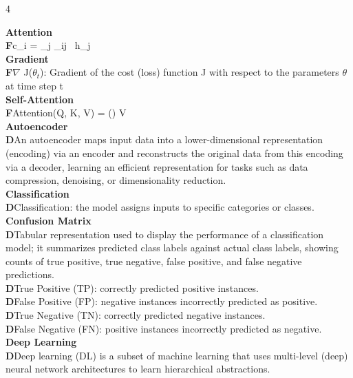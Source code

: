 \documentclass[8pt]{extarticle}
\newcommand{\ftag}{\textcolor{formulacolor}{\tiny\textbf{F}}\;}
\newcommand{\dtag}{\textcolor{definitioncolor}{\tiny\textbf{D}}\;}
\begin{document}
\scriptsize
\begin{multicols}{4}

\vspace{2pt}\textbf{Attention}\\
\ftag c\_i = \sum\_{j} \alpha\_{ij} \, h\_j\\
\vspace{2pt}\textbf{Gradient}\\
\ftag $\nabla$ J($\theta_t$): Gradient of the cost (loss) function J with respect to the parameters $\theta$ at time step t\\
\vspace{2pt}\textbf{Self-Attention}\\
\ftag Attention(Q, K, V) = \left(\right) V\\
\vspace{2pt}\textbf{Autoencoder}\\
\dtag An autoencoder maps input data into a lower-dimensional representation (encoding) via an encoder and reconstructs the original data from this encoding via a decoder, learning an efficient representation for tasks such as data compression, denoising, or dimensionality reduction.\\
\vspace{2pt}\textbf{Classification}\\
\dtag Classification: the model assigns inputs to specific categories or classes.\\
\vspace{2pt}\textbf{Confusion Matrix}\\
\dtag Tabular representation used to display the performance of a classification model; it summarizes predicted class labels against actual class labels, showing counts of true positive, true negative, false positive, and false negative predictions.\\
\dtag True Positive (TP): correctly predicted positive instances.\\
\dtag False Positive (FP): negative instances incorrectly predicted as positive.\\
\dtag True Negative (TN): correctly predicted negative instances.\\
\dtag False Negative (FN): positive instances incorrectly predicted as negative.\\
\vspace{2pt}\textbf{Deep Learning}\\
\dtag Deep learning (DL) is a subset of machine learning that uses multi-level (deep) neural network architectures to learn hierarchical abstractions.\\

\end{multicols}
\end{document}
